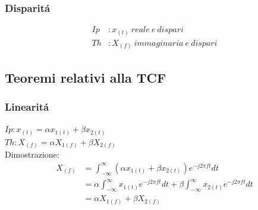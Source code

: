         \subsubsection{Disparitá}\label{Disparita}
            \begin{align}
                Ip&: x_{(t)}\ reale\ e\ dispari  \nonumber \\
                Th&: X_{(f)}\ immaginaria\ e\ dispari \nonumber 
            \end{align}

    \subsection{Teoremi relativi alla TCF}
        \subsubsection{Linearitá}\label{Linearita}
            $Ip: x_{(t)} = \alpha x_{1(t)} + \beta x_{2(t)}$\\        
            $Th: X_{(f)} = \alpha X_{1(f)} + \beta X_{2(f)}$\\ 
            Dimostrazione:
            \begin{align}
                X_{(f)} & = \int_{-\infty}^{\infty} (\alpha x_{1(t)} + \beta x_{2(t)}) e^{-j2\pi ft} dt \nonumber \\
                        & = \alpha \int_{-\infty}^{\infty} x_{1(t)} e^{-j2\pi ft} dt + \beta \int_{-\infty}^{\infty}  x_{2(t)} e^{-j2\pi ft} dt  \nonumber \\
                        & = \alpha X_{1(f)} + \beta X_{2(f)} \nonumber
            \end{align}

